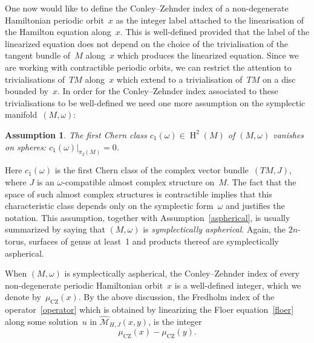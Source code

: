 \documentclass[12pt,twoside]{amsart}
\theoremstyle{plain}
\newtheorem{assumption}[theorem]{Assumption}
\numberwithin{figure}{section}
\numberwithin{equation}{section}
\def\H{\operatorname{H}}
\def\sCZ{ {\scriptscriptstyle\operatorname{CZ}}}
\def\cm{{\mathcal M}}
\begin{document}
One now would like to define the Conley--Zehnder index of a non-degenerate Hamiltonian periodic orbit~$x$ 
as the integer label attached to the linearisation of the Hamilton equation along~$x$. 
This is well-defined provided that the label of the linearized equation does not depend on the choice of 
the trivialisation of the tangent bundle of~$M$ along~$x$ which produces the linearized equation. 
Since we are working with contractible periodic orbits, we can restrict the attention to trivialisations 
of~$TM$ along~$x$ which extend to a trivialisation of~$TM$ on a disc bounded by~$x$. 
In order for the Conley--Zehnder index associated to these trivialisations to be well-defined 
we need one more assumption on the symplectic manifold~$(M,\omega)$:

\begin{assumption}
The first Chern class $c_1(\omega) \in \H^2(M)$ of $(M,\omega)$ vanishes on spheres: $c_1(\omega)|_{\pi_2(M)}=0$.
\end{assumption} 

Here $c_1(\omega)$ is the first Chern class of the complex vector bundle~$(TM,J)$, 
where $J$ is an $\omega$-compatible almost complex structure on~$M$. 
The fact that the space of such almost complex structures is contractible implies that this characteristic class depends only on the symplectic form~$\omega$ and justifies the notation. 
This assumption, together with Assumption~\ref{aspherical}, is usually summarized by saying that 
$(M,\omega)$ is {\em symplectically aspherical}. Again, the $2n$-torus, surfaces of genus at least~1 and products thereof are symplectically aspherical.

When $(M,\omega)$ is symplectically aspherical, the Conley--Zehnder index of every non-dege\-nerate periodic Hamiltonian orbit~$x$ is a well-defined integer, which we denote by~$\mu_{\sCZ}(x)$. 
By the above discussion, the Fredholm index of the operator~\eqref{operator} 
which is obtained by linearizing the Floer equation~\eqref{floer} along some solution~$u$ 
in $\widehat{\cm}_{H,J}(x,y)$, is the integer
\[
\mu_{\sCZ}(x) - \mu_{\sCZ}(y).
\]
\end{document}
